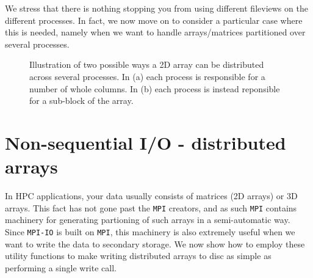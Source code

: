 \documentclass[twoside, 11pt, a4paper]{article}
\begin{document}
We stress that there is nothing stopping you from using different fileviews on
the different processes. In fact, we now move on to consider a particular case where
this is needed, namely when we want to handle arrays/matrices partitioned over
several processes.

\begin{figure}[ht]
	\begin{center}
	\end{center}
	\caption{Illustration of two possible ways a 2D array can be distributed
			 across several processes. In (a) each process is responsible for
			 a number of whole columns. In (b) each process is instead reponsible
			 for a sub-block of the array.}
	\label{fig:darrays}
\end{figure}

\section{Non-sequential I/O - distributed arrays}
In HPC applications, your data usually consists of matrices (2D arrays) or 3D arrays.
This fact has not gone past the \texttt{MPI} creators, and as such \texttt{MPI}
contains machinery for generating partioning of such arrays in a semi-automatic way.
Since \texttt{MPI-IO} is built on \texttt{MPI}, this machinery is also extremely
useful when we want to write the data to secondary storage. We now show how to
employ these utility functions to make writing distributed arrays to disc as simple
as performing a single write call.
\end{document}
